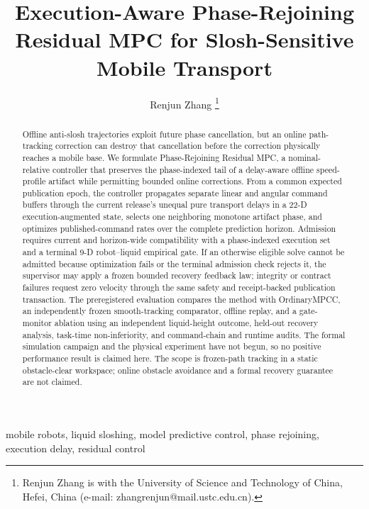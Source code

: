 \documentclass[journal]{IEEEtran}
\title{Execution-Aware Phase-Rejoining Residual MPC for Slosh-Sensitive Mobile Transport}
\author{Renjun Zhang%
\thanks{Renjun Zhang is with the University of Science and Technology of China,
Hefei, China (e-mail: zhangrenjun@mail.ustc.edu.cn).}}
\newcommand{\PRRMPC}{Phase-Rejoining Residual MPC}
\begin{document}
\maketitle

\begin{abstract}
Offline anti-slosh trajectories exploit future phase cancellation, but an online path-tracking correction can destroy that cancellation before the correction physically reaches a mobile base.
We formulate \PRRMPC{}, a nominal-relative controller that preserves the phase-indexed tail of a delay-aware offline speed-profile artifact while permitting bounded online corrections.
From a common expected publication epoch, the controller propagates separate linear and angular command buffers through the current release's unequal pure transport delays in a 22-D execution-augmented state, selects one neighboring monotone artifact phase, and optimizes published-command rates over the complete prediction horizon.
Admission requires current and horizon-wide compatibility with a phase-indexed execution set and a terminal 9-D robot--liquid empirical gate.
If an otherwise eligible solve cannot be admitted because optimization fails or the terminal admission check rejects it, the supervisor may apply a frozen bounded recovery feedback law; integrity or contract failures request zero velocity through the same safety and receipt-backed publication transaction.
The preregistered evaluation compares the method with OrdinaryMPCC, an independently frozen smooth-tracking comparator, offline replay, and a gate-monitor ablation using an independent liquid-height outcome, held-out recovery analysis, task-time non-inferiority, and command-chain and runtime audits.
The formal simulation campaign and the physical experiment have not begun, so no positive performance result is claimed here.
The scope is frozen-path tracking in a static obstacle-clear workspace; online obstacle avoidance and a formal recovery guarantee are not claimed.
\end{abstract}

\begin{IEEEkeywords}
mobile robots, liquid sloshing, model predictive control, phase rejoining, execution delay, residual control
\end{IEEEkeywords}






\end{document}
